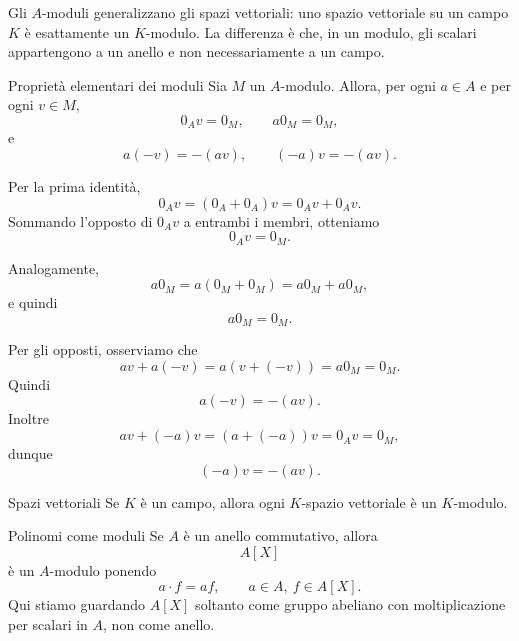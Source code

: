 \documentclass[a4paper]{article}
\begin{document}
\begin{radioactive}
Gli \(A\)-moduli generalizzano gli spazi vettoriali: uno spazio vettoriale su un campo \(K\) è esattamente un \(K\)-modulo. La differenza è che, in un modulo, gli scalari appartengono a un anello e non necessariamente a un campo.
\end{radioactive}

\begin{radioactive}
\begin{snippetproposition}{Proprietà elementari dei moduli}
    Sia \(M\) un \(A\)-modulo. Allora, per ogni \(a\in A\) e per ogni \(v\in M\),
    \[
        0_Av=0_M,
        \qquad
        a0_M=0_M,
    \]
    e
    \[
        a(-v)=-(av),
        \qquad
        (-a)v=-(av).
    \]
\end{snippetproposition}
\end{radioactive}

\begin{radioactive}
\begin{snippetproof}{}
    Per la prima identità,
    \[
        0_Av=(0_A+0_A)v=0_Av+0_Av.
    \]
    Sommando l'opposto di \(0_Av\) a entrambi i membri, otteniamo
    \[
        0_Av=0_M.
    \]

    Analogamente,
    \[
        a0_M=a(0_M+0_M)=a0_M+a0_M,
    \]
    e quindi
    \[
        a0_M=0_M.
    \]

    Per gli opposti, osserviamo che
    \[
        av+a(-v)=a(v+(-v))=a0_M=0_M.
    \]
    Quindi
    \[
        a(-v)=-(av).
    \]
    Inoltre
    \[
        av+(-a)v=(a+(-a))v=0_Av=0_M,
    \]
    dunque
    \[
        (-a)v=-(av).
    \]
\end{snippetproof}
\end{radioactive}

\begin{radioactive}
\begin{snippetexample}{Spazi vettoriali}
    Se \(K\) è un campo, allora ogni \(K\)-spazio vettoriale è un \(K\)-modulo.
\end{snippetexample}
\end{radioactive}

\begin{radioactive}
\begin{snippetexample}{Polinomi come moduli}
    Se \(A\) è un anello commutativo, allora
    \[
        A[X]
    \]
    è un \(A\)-modulo ponendo
    \[
        a\cdot f=af,
        \qquad
        a\in A,\ f\in A[X].
    \]
    Qui stiamo guardando \(A[X]\) soltanto come gruppo abeliano con moltiplicazione per scalari in \(A\), non come anello.
\end{snippetexample}
\end{radioactive}
\end{document}
